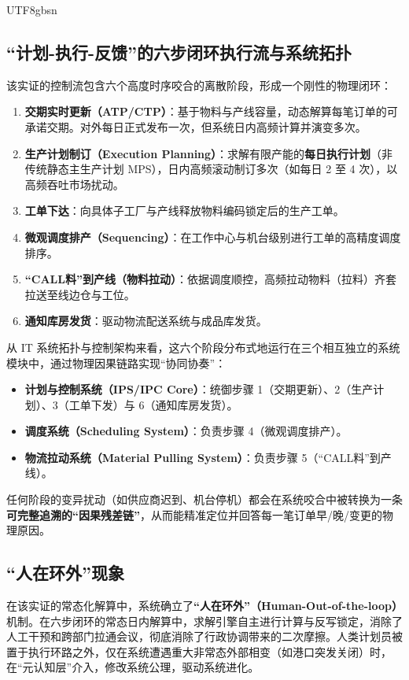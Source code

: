\documentclass[11pt,a4paper]{article}
\begin{document}
\begin{CJK*}{UTF8}{gbsn}
\subsection{“计划-执行-反馈”的六步闭环执行流与系统拓扑}
该实证的控制流包含六个高度时序咬合的离散阶段，形成一个刚性的物理闭环：
\begin{enumerate}
    \item \textbf{交期实时更新（ATP/CTP）}：基于物料与产线容量，动态解算每笔订单的可承诺交期。对外每日正式发布一次，但系统日内高频计算并演变多次。
    \item \textbf{生产计划制订（Execution Planning）}：求解有限产能的\textbf{每日执行计划}（非传统静态主生产计划 MPS），日内高频滚动制订多次（如每日 2 至 4 次），以高频吞吐市场扰动。
    \item \textbf{工单下达}：向具体子工厂与产线释放物料编码锁定后的生产工单。
    \item \textbf{微观调度排产（Sequencing）}：在工作中心与机台级别进行工单的高精度调度排序。
    \item \textbf{“CALL料”到产线（物料拉动）}：依据调度顺控，高频拉动物料（拉料）齐套拉送至线边仓与工位。
    \item \textbf{通知库房发货}：驱动物流配送系统与成品库发货。
\end{enumerate}

从 IT 系统拓扑与控制架构来看，这六个阶段分布式地运行在三个相互独立的系统模块中，通过物理因果链路实现“协同协奏”：
\begin{itemize}
    \item \textbf{计划与控制系统（IPS/IPC Core）}：统御步骤 1（交期更新）、2（生产计划）、3（工单下发）与 6（通知库房发货）。
    \item \textbf{调度系统（Scheduling System）}：负责步骤 4（微观调度排产）。
    \item \textbf{物流拉动系统（Material Pulling System）}：负责步骤 5（“CALL料”到产线）。
\end{itemize}

任何阶段的变异扰动（如供应商迟到、机台停机）都会在系统咬合中被转换为一条\textbf{可完整追溯的“因果残差链”}，从而能精准定位并回答每一笔订单早/晚/变更的物理原因。

\subsection{“人在环外”现象}
在该实证的常态化解算中，系统确立了\textbf{“人在环外”（Human-Out-of-the-loop）}机制。在六步闭环的常态日内解算中，求解引擎自主进行计算与反写锁定，消除了人工干预和跨部门拉通会议，彻底消除了行政协调带来的二次摩擦。人类计划员被置于执行环路之外，仅在系统遭遇重大非常态外部相变（如港口突发关闭）时，在“元认知层”介入，修改系统公理，驱动系统进化。


\end{CJK*}
\end{document}
